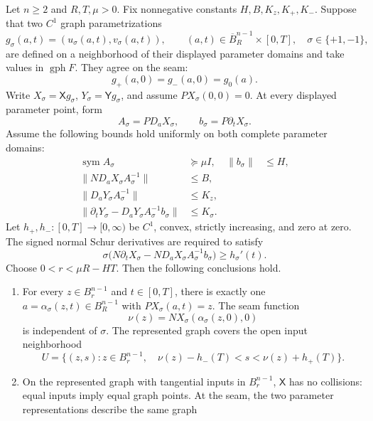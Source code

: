 \begin{theorem}
\label{thm:signed-schur-growth}
Let \(n\ge2\) and \(R,T,\mu>0\).
Fix nonnegative constants \(H,B,K_z,K_+,K_-\).
Suppose that two \(C^1\) graph parametrizations
\[
 g_\sigma(a,t)=(u_\sigma(a,t),v_\sigma(a,t)),
 \qquad (a,t)\in\overline B_R^{n-1}\times[0,T],
 \quad \sigma\in\{+1,-1\},
\]
are defined on a neighborhood of their displayed parameter domains and
take values in \(\operatorname{gph}F\).  They agree on the seam:
\[
 g_+(a,0)=g_-(a,0)=g_0(a).
 \tag{S1}\label{eq:schur-seam}
\]
Write \(X_\sigma=\mathsf Xg_\sigma\),
\(Y_\sigma=\mathsf Yg_\sigma\), and assume
\(PX_\sigma(0,0)=0\).  At every displayed parameter point, form
\[
 A_\sigma=P D_aX_\sigma,
 \qquad b_\sigma=P\partial_tX_\sigma.
\]
Assume the following bounds hold uniformly on both complete parameter
domains:
\begin{align}
 \operatorname{sym} A_\sigma&\succeq\mu I,
 &\|b_\sigma\|&\le H,
 \tag{S2}\label{eq:schur-tangent}\\
 \|N D_aX_\sigma A_\sigma^{-1}\|&\le B,
 \tag{S3}\label{eq:schur-normal-tangent}\\
 \|D_aY_\sigma A_\sigma^{-1}\|&\le K_z,
 \tag{S4}\label{eq:schur-output-tangent}\\
 \|\partial_tY_\sigma-
       D_aY_\sigma A_\sigma^{-1}b_\sigma\|&\le K_\sigma.
 \tag{S5}\label{eq:schur-output-normal}
\end{align}
Let \(h_+,h_-:[0,T]\to[0,\infty)\) be \(C^1\), convex, strictly
increasing, and zero at zero.  The signed normal Schur derivatives are
required to satisfy
\[
 \sigma\bigl(N\partial_tX_\sigma-
       ND_aX_\sigma A_\sigma^{-1}b_\sigma\bigr)
       \ge h_\sigma'(t).
 \tag{S6}\label{eq:schur-normal-growth}
\]
Choose \(0<r<\mu R-HT\).  Then the following conclusions hold.
\begin{enumerate}
\item For every \(z\in B_r^{n-1}\) and \(t\in[0,T]\), there is exactly
one \(a=\alpha_\sigma(z,t)\in B_R^{n-1}\) with
\(PX_\sigma(a,t)=z\).  The seam function
\[
 \nu(z)=NX_\sigma(\alpha_\sigma(z,0),0)
\]
is independent of \(\sigma\).  The represented graph covers the open
input neighborhood
\[
 U=\{(z,s):z\in B_r^{n-1},\quad
       \nu(z)-h_-(T)<s<\nu(z)+h_+(T)\}.
 \tag{S7}\label{eq:schur-covered-neighborhood}
\]
\item On the represented graph with tangential inputs in \(B_r^{n-1}\),
\(\mathsf X\) has no collisions: equal inputs imply equal graph points.
At the seam, the two parameter representations describe the same graph

\end{enumerate}
\end{theorem}

